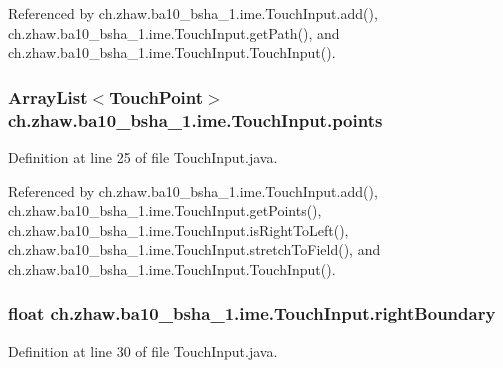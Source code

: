 Referenced by ch.zhaw.ba10\_\-bsha\_\-1.ime.TouchInput.add(), ch.zhaw.ba10\_\-bsha\_\-1.ime.TouchInput.getPath(), and ch.zhaw.ba10\_\-bsha\_\-1.ime.TouchInput.TouchInput().\hypertarget{classch_1_1zhaw_1_1ba10__bsha__1_1_1ime_1_1TouchInput_a03a322fbe00768dea16f01801bdcc3b8}{
\subsubsection[{points}]{\setlength{\rightskip}{0pt plus 5cm}ArrayList$<${\bf TouchPoint}$>$ {\bf ch.zhaw.ba10\_\-bsha\_\-1.ime.TouchInput.points}}}
\label{classch_1_1zhaw_1_1ba10__bsha__1_1_1ime_1_1TouchInput_a03a322fbe00768dea16f01801bdcc3b8}


Definition at line 25 of file TouchInput.java.

Referenced by ch.zhaw.ba10\_\-bsha\_\-1.ime.TouchInput.add(), ch.zhaw.ba10\_\-bsha\_\-1.ime.TouchInput.getPoints(), ch.zhaw.ba10\_\-bsha\_\-1.ime.TouchInput.isRightToLeft(), ch.zhaw.ba10\_\-bsha\_\-1.ime.TouchInput.stretchToField(), and ch.zhaw.ba10\_\-bsha\_\-1.ime.TouchInput.TouchInput().\hypertarget{classch_1_1zhaw_1_1ba10__bsha__1_1_1ime_1_1TouchInput_a2006af7bf2e20ee8082b41b0ff80810a}{
\subsubsection[{rightBoundary}]{\setlength{\rightskip}{0pt plus 5cm}float {\bf ch.zhaw.ba10\_\-bsha\_\-1.ime.TouchInput.rightBoundary}}}
\label{classch_1_1zhaw_1_1ba10__bsha__1_1_1ime_1_1TouchInput_a2006af7bf2e20ee8082b41b0ff80810a}


Definition at line 30 of file TouchInput.java.

